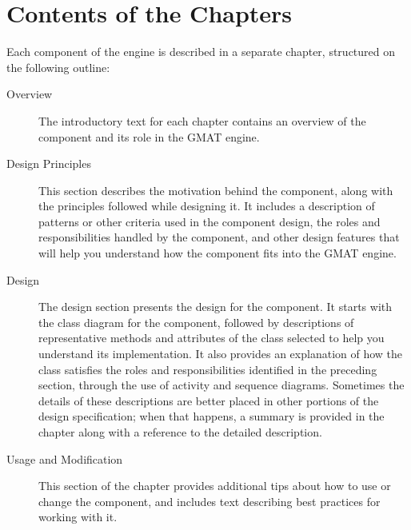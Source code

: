 \section*{Contents of the Chapters}

Each component of the engine is described in a separate chapter, structured on the following
outline:

\begin{description}
\item[Overview]

The introductory text for each chapter contains an overview of the component and its role in the
GMAT engine.

\item[Design Principles]

This section describes the motivation behind the component, along with the principles followed while
designing it.  It includes a description of patterns or other criteria used in the component design,
the roles and responsibilities handled by the component, and other design features that will help
you understand how the component fits into the GMAT engine.

\item[Design]

The design section presents the design for the component.  It starts with the class diagram
for the component, followed by descriptions of representative methods and attributes of the class
selected to help you understand its implementation.  It also provides an explanation of how the
class satisfies the roles and responsibilities identified in the preceding section, through the use
of activity and sequence diagrams.  Sometimes the details of these descriptions are better placed in
other portions of the design specification; when that happens, a summary is provided in the chapter
along with a reference to the detailed description.

\item[Usage and Modification]

This section of the chapter provides additional tips about how to use or change the component, and
includes text describing best practices for working with it.
\end{description}

